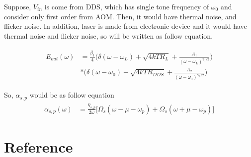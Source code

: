 \documentclass[%
 reprint,
 amsmath,amssymb,
 aps,
]{revtex4-2}
\begin{document}
Suppose, $V_{in}$ is come from DDS, which has single tone frequency of $\omega_{0}$ and consider only first order from AOM. Then, it would have thermal noise, and flicker noise. In addition, laser is made from electronic device and it would have thermal noise and flicker noise, so will be written as follow equation.

\begin{align}
	\begin{aligned}
	E_{out}(\omega) &= \frac{\beta_{1}}{4}\Bigg(\delta(\omega - \omega_{L}) + \sqrt{4kTR_{L}} + \frac{A_{1}}{(\omega-\omega_{L})^{\gamma_{1}/2}}\Bigg)\\
	&* \Bigg(\delta(\omega-\omega_{0}) + \sqrt{4kTR_{DDS}} + \frac{A_{2}}{(\omega-\omega_{0})^{\gamma_{2}/2}}\Bigg)
	\end{aligned}
\end{align}

So, $\alpha_{s,p}$ would be as follow equation
\begin{align}
	\begin{aligned}	
		\alpha_{s,p}(\omega) &= \frac{\eta_{s,p}}{2\omega}\Bigg[\Omega_{s}(\omega - \mu - \omega_{p})+\Omega_{s}(\omega + \mu - \omega_{p})\Bigg]
	\end{aligned}
\end{align}

\section{\label{sec:level1}Reference}
\end{document}
